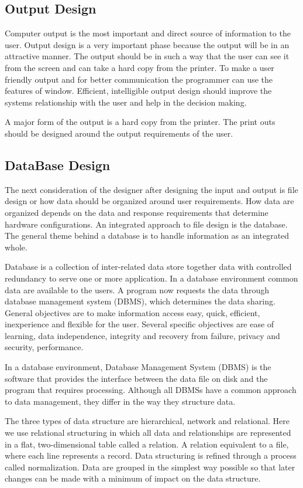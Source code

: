 \documentclass[a4paper,12pt]{article}
\begin{document}
\subsection{Output Design}\vspace{2mm}
            Computer output is the most important and direct source of information to the user. Output design is a very important phase because the output will be in an attractive manner. The output should be in such a way that the user can see it from the screen and can take a hard copy from the printer. To make a user friendly output and for better communication the programmer can use the features of window. Efficient, intelligible output design should improve the systems relationship with the user and help in the decision making.\par\vspace{2mm}  A major form of the output is a hard copy from the printer. The print outs should be designed around the output requirements of the user.
\subsection{DataBase Design}\vspace{2mm}
The next consideration of the designer after designing the input and output is file design or how data should be organized around user requirements. How data are organized depends on the data and response requirements that determine hardware configurations. An integrated approach to file design is the database. The general theme behind a database is to handle information as an integrated whole.
\par\vspace{2mm}
Database is a collection of inter-related data store together data with controlled redundancy to serve one or more application. In a database environment common data are available to the users. A program now requests the data through database management system (DBMS), which determines the data sharing. General objectives are to make information access easy, quick, efficient, inexperience and flexible for the user. Several specific objectives are ease of learning, data independence, integrity and recovery from failure, privacy and security, performance.\par\vspace{2mm}
\newpage
In a database environment, Database Management System (DBMS) is the software that provides the interface between the data file on disk and the program that requires processing. Although all DBMSs have a common approach to data management, they differ in the way they structure data.
\par\vspace{2mm}
 The three types of data structure are hierarchical, network and relational. Here we use relational structuring in which all data and relationships are represented in a flat, two-dimensional table called a relation. A relation equivalent to a file, where each line represents a record. Data structuring is refined through a process called normalization. Data are grouped in the simplest way possible so that later changes can be made with a minimum of impact on the data structure.
\end{document}

